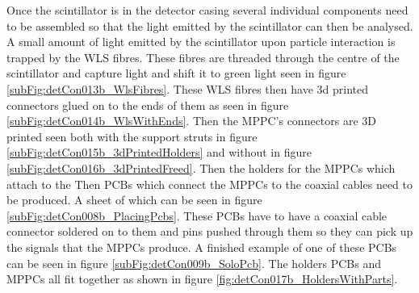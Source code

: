 Once the scintillator is in the detector casing several individual components need to be assembled so that the light emitted by the scintillator can then be analysed. A small amount of light emitted by the scintillator upon particle interaction is trapped by the WLS fibres. These fibres are threaded through the centre of the scintillator and capture light and shift it to green light seen in figure \ref{subFig:detCon013b_WlsFibres}. These WLS fibres then have 3d printed connectors glued on to the ends of them as seen in figure \ref{subFig:detCon014b_WlsWithEnds}. Then the MPPC's connectors are 3D printed seen both with the support struts in figure \ref{subFig:detCon015b_3dPrintedHolders} and without in figure \ref{subFig:detCon016b_3dPrintedFreed}. Then the holders for the MPPCs which attach to the Then PCBs which connect the MPPCs to the coaxial cables need to be produced. A sheet of which can be seen in figure \ref{subFig:detCon008b_PlacingPcbs}. These PCBs have to have a coaxial cable connector soldered on to them and pins pushed through them so they can pick up the signals that the MPPCs produce. A finished example of one of these PCBs can be seen in figure \ref{subFig:detCon009b_SoloPcb}. The holders PCBs and MPPCs all fit together as shown in figure \ref{fig:detCon017b_HoldersWithParts}.

